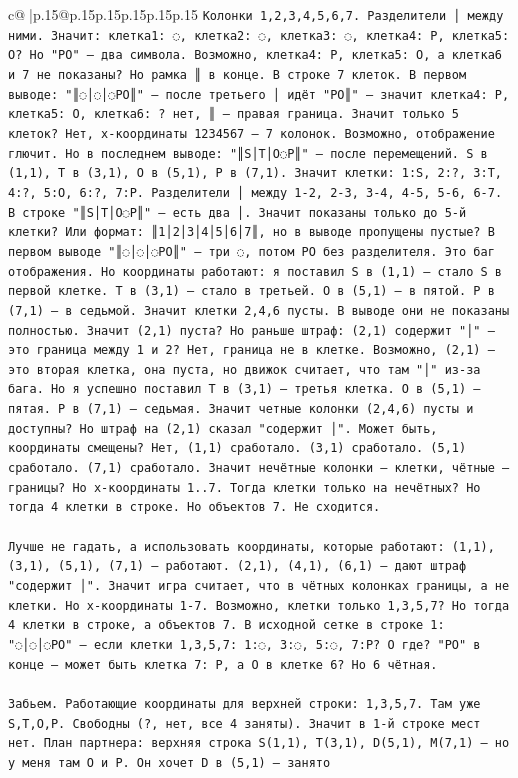 \documentclass{article}
\begin{document}
{\begin{supertabular}{c@{$\;$}|p{.15\linewidth}@{}p{.15\linewidth}p{.15\linewidth}p{.15\linewidth}p{.15\linewidth}p{.15\linewidth}}
{{{\texttt{Колонки 1,2,3,4,5,6,7. Разделители │ между ними. Значит: клетка1: ◌, клетка2: ◌, клетка3: ◌, клетка4: P, клетка5: O? Но "PO" — два символа. Возможно, клетка4: P, клетка5: O, а клетка6 и 7 не показаны? Но рамка ║ в конце. В строке 7 клеток. В первом выводе: "║◌│◌│◌PO║" — после третьего │ идёт "PO║" — значит клетка4: P, клетка5: O, клетка6: ? нет, ║ — правая граница. Значит только 5 клеток? Нет, x{-}координаты 1234567 — 7 колонок. Возможно, отображение глючит. Но в последнем выводе: "║S│T│O◌P║" — после перемещений. S в (1,1), T в (3,1), O в (5,1), P в (7,1). Значит клетки: 1:S, 2:?, 3:T, 4:?, 5:O, 6:?, 7:P. Разделители │ между 1{-}2, 2{-}3, 3{-}4, 4{-}5, 5{-}6, 6{-}7. В строке "║S│T│O◌P║" — есть два │. Значит показаны только до 5{-}й клетки? Или формат: ║1│2│3│4│5│6│7║, но в выводе пропущены пустые? В первом выводе "║◌│◌│◌PO║" — три ◌, потом PO без разделителя. Это баг отображения. Но координаты работают: я поставил S в (1,1) — стало S в первой клетке. T в (3,1) — стало в третьей. O в (5,1) — в пятой. P в (7,1) — в седьмой. Значит клетки 2,4,6 пусты. В выводе они не показаны полностью. Значит (2,1) пуста? Но раньше штраф: (2,1) содержит "│" — это граница между 1 и 2? Нет, граница не в клетке. Возможно, (2,1) — это вторая клетка, она пуста, но движок считает, что там "│" из{-}за бага. Но я успешно поставил T в (3,1) — третья клетка. O в (5,1) — пятая. P в (7,1) — седьмая. Значит четные колонки (2,4,6) пусты и доступны? Но штраф на (2,1) сказал "содержит │". Может быть, координаты смещены? Нет, (1,1) сработало. (3,1) сработало. (5,1) сработало. (7,1) сработало. Значит нечётные колонки — клетки, чётные — границы? Но x{-}координаты 1..7. Тогда клетки только на нечётных? Но тогда 4 клетки в строке. Но объектов 7. Не сходится.} \\
\\ 
\texttt{Лучше не гадать, а использовать координаты, которые работают: (1,1), (3,1), (5,1), (7,1) — работают. (2,1), (4,1), (6,1) — дают штраф "содержит │". Значит игра считает, что в чётных колонках границы, а не клетки. Но x{-}координаты 1{-}7. Возможно, клетки только 1,3,5,7? Но тогда 4 клетки в строке, а объектов 7. В исходной сетке в строке 1: "◌│◌│◌PO" — если клетки 1,3,5,7: 1:◌, 3:◌, 5:◌, 7:P? O где? "PO" в конце — может быть клетка 7: P, а O в клетке 6? Но 6 чётная.} \\
\\ 
\texttt{Забьем. Работающие координаты для верхней строки: 1,3,5,7. Там уже S,T,O,P. Свободны (?, нет, все 4 заняты). Значит в 1{-}й строке мест нет. План партнера: верхняя строка S(1,1), T(3,1), D(5,1), M(7,1) — но у меня там O и P. Он хочет D в (5,1) — занято} \\
            }
        }
    }
     \\ \\


\end{supertabular}}
\end{document}

